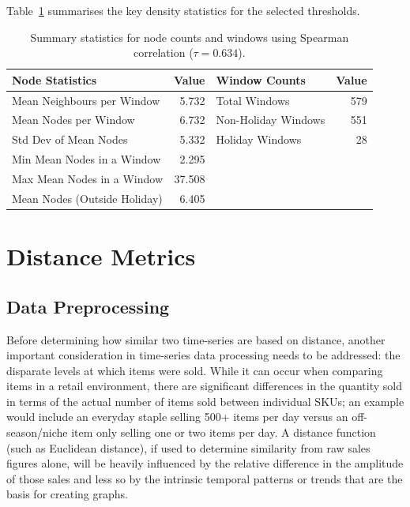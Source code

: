 Table~\ref{tab:spearman_threshold_density} summarises the key density statistics
for the selected thresholds.

\begin{table}[ht]
\centering
\caption{Summary statistics for node counts and windows using Spearman correlation ($\tau = 0.634$).}
\label{tab:spearman_threshold_density}
\begin{tabular}{lrlr}
\toprule
\textbf{Node Statistics} & \textbf{Value} & \textbf{Window Counts} & \textbf{Value} \\
\midrule
Mean Neighbours per Window & 5.732 & Total Windows & 579 \\
Mean Nodes per Window & 6.732 & Non-Holiday Windows & 551 \\
Std Dev of Mean Nodes & 5.332 & Holiday Windows & 28 \\
Min Mean Nodes in a Window & 2.295 & & \\
Max Mean Nodes in a Window & 37.508 & & \\
Mean Nodes (Outside Holiday) & 6.405 & & \\
\bottomrule
\end{tabular}
\end{table}


\section{Distance Metrics}
\label{subsec:cid_graphs}

\subsection{Data Preprocessing}

Before determining how similar two time-series are based on distance, another important consideration in time-series data processing needs to be addressed: the disparate levels at which items were sold. While it can occur when comparing items in a retail environment, there are significant differences in the quantity sold in terms of the actual number of items sold between individual SKUs; an example would include an everyday staple selling 500+ items per day versus an off-season/niche item only selling one or two items per day. A distance function (such as Euclidean distance), if used to determine similarity from raw sales figures alone, will be heavily influenced by the relative difference in the amplitude of those sales and less so by the intrinsic temporal patterns or trends that are the basis for creating graphs.

